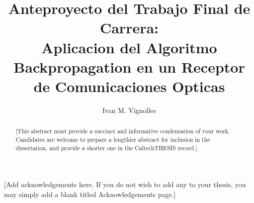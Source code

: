 \documentclass[12pt, twoside]{unc_so2_template}
\begin{document}


\title{Anteproyecto del Trabajo Final de Carrera:\\
  Aplicacion del Algoritmo Backpropagation en un Receptor de Comunicaciones Opticas}
\author{Ivan M. Vignolles}

\address{Córdoba, República Argentina}                     %



\maketitle[logo]

\begin{acknowledgments}
  \setcounter{page}{3}
   [Add acknowledgements here. If you do not wish to add any to your thesis, you may simply add a blank titled Acknowledgements page.]
\end{acknowledgments}

\begin{abstract}
   [This abstract must provide a succinct and informative condensation of your work. Candidates are welcome to prepare a lengthier abstract for inclusion in the dissertation, and provide a shorter one in the CaltechTHESIS record.]
\end{abstract}
\end{document}
